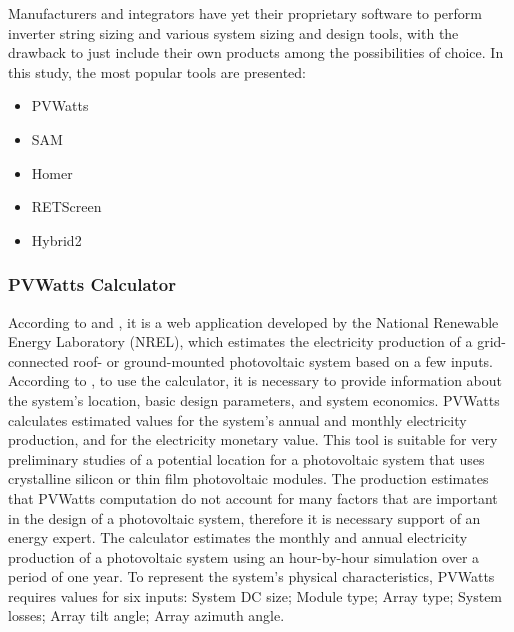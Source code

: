 Manufacturers and integrators have yet their proprietary software to perform inverter string sizing and various system sizing and design tools, with the drawback to just include their own products among the possibilities of choice. 
In this study, the most popular tools are presented: 

\begin{itemize}
\item PVWatts 
\item SAM
\item Homer
\item RETScreen
\item Hybrid2
\end{itemize}

\subsubsection{PVWatts Calculator}
According to \cite{Freeman} and \cite{NRELDobos}, it is a web application developed by the National Renewable Energy Laboratory (NREL), which estimates the electricity production of a grid-connected roof- or ground-mounted photovoltaic system based on a few inputs. According to \cite{NRELDobos}, to use the calculator, it is necessary to provide information about the system's location, basic design parameters, and system economics. PVWatts calculates estimated values for the system's annual and monthly electricity production, and for the electricity monetary value. This tool is suitable for very preliminary studies of a potential location for a photovoltaic system that uses crystalline silicon or thin film photovoltaic modules. The production estimates that PVWatts computation do not account for many factors that are important in the design of a photovoltaic system, therefore it is necessary support of an energy expert. The calculator estimates the monthly and annual electricity production of a photovoltaic system using an hour-by-hour simulation over a period of one year. To represent the system's physical characteristics, PVWatts requires values for six inputs: System DC size; Module type; Array type; System losses; Array tilt angle; Array azimuth angle.

